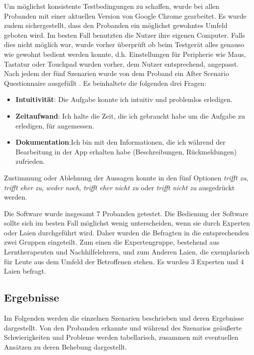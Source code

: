 Um möglichst konsistente Testbedingungen zu schaffen, wurde bei allen Probanden mit einer aktuellen Version von Google Chrome gearbeitet. Es wurde zudem sichergestellt, dass den Probanden ein möglichst gewohntes Umfeld geboten wird. Im besten Fall benutzten die Nutzer ihre eigenen Computer. Falls dies nicht möglich war, wurde vorher überprüft ob beim Testgerät alles genauso wie gewohnt bedient werden konnte, d.h. Einstellungen für Peripherie wie Maus, Tastatur oder Touchpad wurden vorher, dem Nutzer entsprechend, angepasst.\\

Nach jedem der fünf Szenarien wurde von dem Proband ein After Scenario Questionnaire ausgefüllt . Es beinhaltete die folgenden drei Fragen:
\begin{itemize}
	\item \textbf{Intuitivität}: Die Aufgabe konnte ich intuitiv und problemlos erledigen.
	\item \textbf{Zeitaufwand}: Ich halte die Zeit, die ich gebraucht habe um die Aufgabe zu erledigen, für angemessen.
	\item \textbf{Dokumentation}:Ich bin mit den Informationen, die ich während der Bearbeitung in der App erhalten habe (Beschreibungen, Rückmeldungen) zufrieden.
\end{itemize}

Zustimmung oder Ablehnung der Aussagen konnte in den fünf Optionen \textit{trifft zu}, \textit{trifft eher zu}, \textit{weder noch}, \textit{trifft eher nicht zu} oder \textit{trifft nicht zu} ausgedrückt werden.

Die Software wurde insgesamt 7 Probanden getestet. Die Bedienung der Software sollte sich im besten Fall möglichst wenig unterscheiden, wenn sie durch Experten oder Laien durchgeführt wird. Daher wurden die Befragten in die entsprechenden zwei Gruppen eingeteilt. Zum einen die Expertengruppe, bestehend aus Lerntherapeuten und Nachhilfelehrern, und zum Anderen Laien, die exemplarisch für Leute aus dem Umfeld der Betroffenen stehen. Es wurden 3 Experten und 4 Laien befragt.\\

\subsection{Ergebnisse}

Im Folgenden werden die einzelnen Szenarien beschrieben und deren Ergebnisse dargestellt. Von den Probanden erkannte und während des Szenarios geäußerte Schwierigkeiten und Probleme werden tabellarisch, zusammen mit eventuellen Ansätzen zu deren Behebung dargestellt.


